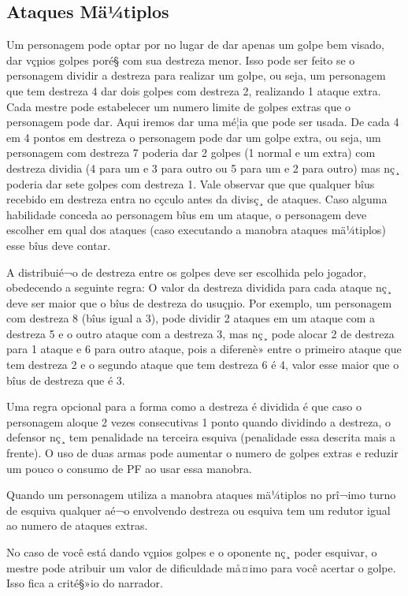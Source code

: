 \subsection{Ataques Mä¼tiplos}

Um personagem pode optar por no lugar de dar apenas um golpe bem visado, dar vçµios golpes poré§ com sua destreza menor. Isso pode ser feito se o personagem dividir a destreza para realizar um golpe, ou seja, um personagem que tem destreza 4 dar dois golpes com destreza 2, realizando 1 ataque extra. Cada mestre pode estabelecer um numero limite de golpes extras que o personagem pode dar. Aqui iremos dar uma mé¦ia que pode ser usada. De cada 4 em 4 pontos em destreza o personagem pode dar um golpe extra, ou seja, um personagem com destreza 7 poderia dar 2 golpes (1 normal e um extra) com destreza dividia (4 para um e 3 para outro ou 5 para um e 2 para outro) mas nç¸ poderia dar sete golpes com destreza 1. Vale observar que que qualquer bîus recebido em destreza entra no cçculo antes da divisç¸ de ataques. Caso alguma habilidade conceda ao personagem bîus em um ataque, o personagem deve escolher em qual dos ataques (caso executando a manobra ataques mä¼tiplos) esse bîus deve contar.

A distribuié¬o de destreza entre os golpes deve ser escolhida pelo jogador, obedecendo a seguinte regra: O valor da destreza dividida para cada ataque nç¸ deve ser maior que o bîus de destreza do usuçµio. Por exemplo, um personagem com destreza 8 (bîus igual a 3), pode dividir 2 ataques em um ataque com a destreza 5 e o outro ataque com a destreza 3, mas nç¸ pode alocar 2 de destreza para 1 ataque e 6 para outro ataque, pois a diferenè» entre o primeiro ataque que tem destreza 2 e o segundo ataque que tem destreza 6 é 4, valor esse maior que o bîus de destreza que é 3.

Uma regra opcional para a forma como a destreza é dividida é que caso o personagem aloque 2 vezes consecutivas 1 ponto quando dividindo a destreza, o defensor nç¸ tem penalidade na terceira esquiva (penalidade essa descrita mais a frente). O uso de duas armas pode aumentar o numero de golpes extras e reduzir um pouco o consumo de PF ao usar essa manobra. 

Quando um personagem utiliza a manobra ataques mä¼tiplos no prî¬imo turno de esquiva qualquer aé¬o envolvendo destreza ou esquiva tem um redutor igual ao numero de ataques extras.
	
No caso de você está dando vçµios golpes e o oponente nç¸ poder esquivar, o mestre pode atribuir um valor de dificuldade må¤imo para você acertar o golpe. Isso fica a crité§»io do narrador.
	
